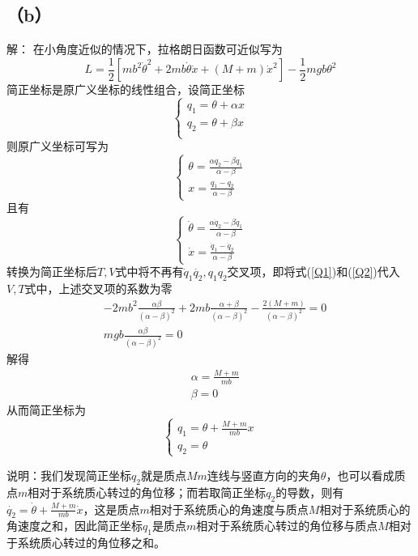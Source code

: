\documentclass[10pt,a4paper]{article}
\begin{document}
\subsection*{（b）}解：
在小角度近似的情况下，拉格朗日函数可近似写为
\[
L=\frac{1}{2}[mb^2\dot{\theta}^2+2mb\dot{\theta}\dot{x}+(M+m)\dot{x}^2]-\frac{1}{2}mgb\theta^2
\]
简正坐标是原广义坐标的线性组合，设简正坐标
\[
\left\{\begin{array}{ll}
q_1=\theta+\alpha x\\
q_2=\theta+\beta x\\
\end{array}\right.
\]
则原广义坐标可写为
\begin{equation}
\label{Q1}
\left\{\begin{array}{ll}
\theta=\frac{\alpha q_2-\beta q_1}{\alpha-\beta}\\
x=\frac{q_1-q_2}{\alpha-\beta}
\end{array}\right.
\end{equation}
且有
\begin{equation}
\label{Q2}
\left\{\begin{array}{ll}
\dot{\theta}=\frac{\alpha\dot{q}_2-\beta\dot{q}_1}{\alpha-\beta}\\
\dot{x}=\frac{\dot{q}_1-\dot{q}_2}{\alpha-\beta}
\end{array}\right.
\end{equation}
转换为简正坐标后$T,V$式中将不再有$\dot{q}_1\dot{q_2},q_1q_2$交叉项，即将式(\ref{Q1})和(\ref{Q2})代入$V,T$式中，上述交叉项的系数为零
\begin{align*}
&-2mb^2\frac{\alpha\beta}{(\alpha-\beta)^2}+2mb\frac{\alpha+\beta}{(\alpha-\beta)^2}-\frac{2(M+m)}{(\alpha-\beta)^2}=0\\
&mgb\frac{\alpha\beta}{(\alpha-\beta)^2}=0
\end{align*}
解得
\begin{align*}
&\alpha=\frac{M+m}{mb}\\
&\beta=0
\end{align*}
从而简正坐标为
\begin{equation}
\label{Q3}
\left\{\begin{array}{ll}
q_1=\theta+\frac{M+m}{mb}x\\
q_2=\theta
\end{array}\right.
\end{equation}

说明：我们发现简正坐标$q_2$就是质点$Mm$连线与竖直方向的夹角$\theta$，也可以看成质点$m$相对于系统质心转过的角位移；而若取简正坐标$q_2$的导数，则有$\dot{q_2}=\dot{\theta}+\frac{M+m}{mb}\dot{x}$，这是质点$m$相对于系统质心的角速度与质点$M$相对于系统质心的角速度之和，因此简正坐标$q_1$是质点$m$相对于系统质心转过的角位移与质点$M$相对于系统质心转过的角位移之和。
\end{document}
